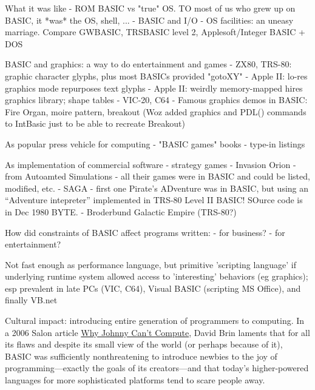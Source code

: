 \documentclass{article}
\begin{document}
What it was like
  - ROM BASIC vs "true" OS.  TO most of us who grew up on BASIC, it
  *was* the OS, shell, ...
  - BASIC and I/O - OS facilities: an uneasy marriage.  Compare GWBASIC,
  TRSBASIC level 2, Applesoft/Integer BASIC + DOS

BASIC and graphics: a way to do entertainment and games
  - ZX80, TRS-80: graphic character glyphs, plus most BASICs provided "gotoXY"
  - Apple II: lo-res graphics mode repurposes text glyphs
  - Apple II: weirdly memory-mapped hires graphics library; shape tables
  - VIC-20, C64
  - Famous graphics demos in BASIC: Fire Organ, moire pattern, breakout
  (Woz added graphics and PDL() commands to IntBasic just to be able to
  recreate Breakout)

As popular press vehicle for computing
  - "BASIC games" books
  - type-in listings

As implementation of commercial software - strategy games
  - Invasion Orion - from Autoamted Simulations - all their games were
  in BASIC and could be listed, modified, etc.
  - SAGA - first one Pirate's ADventure was in BASIC, but using an
  ``Adventure intepreter'' implemented in TRS-80 Level II BASIC!  SOurce
  code is in Dec 1980 BYTE.
  - Broderbund Galactic Empire (TRS-80?)


How did constraints of BASIC affect programs written:
- for business?
- for entertainment?

Not fast enough as performance language, but primitive 'scripting
language' if underlying runtime system allowed access to 'interesting'
behaviors (eg graphics); esp prevalent in late PCs (VIC, C64), Visual
BASIC (scripting MS Office), and finally VB.net

Cultural impact: introducing entire generation of programmers to
computing.
In a 2006 Salon article \href{www.salon.com/2006/09/14/basic_2}{Why Johnny
  Can't Compute},
David Brin laments that for
all its flaws and despite its small view of the world (or perhaps
because of it), BASIC was sufficiently
nonthreatening to introduce newbies to the joy of programming---exactly
the goals of its creators---and that today's higher-powered languages
for more sophisticated platforms tend to scare people away.
\end{document}
